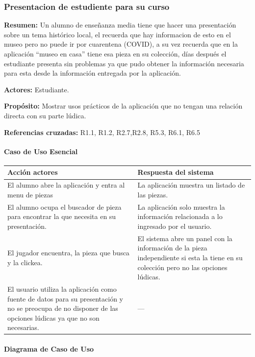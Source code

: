 \subsubsection{Presentacion de estudiente para su curso}

{\textbf {Resumen:}}
Un alumno de enseñanza media tiene que hacer una presentación sobre un tema histórico local, el recuerda que hay informacion de esto en el museo pero no puede ir por cuarentena (COVID), a su vez recuerda que en la aplicación “museo en casa” tiene esa pieza en su colección, días después el estudiante presenta sin problemas ya que pudo obtener la información necesaria para esta desde la información entregada por la aplicación.

{\textbf {Actores:}}
Estudiante.

{\textbf {Propósito:}}
Mostrar usos prácticos de la aplicación que no tengan una relación directa con su parte lúdica.

{\textbf {Referencias cruzadas:}}
R1.1, R1.2, R2.7,R2.8, R5.3, R6.1, R6.5

\paragraph{Caso de Uso Esencial}

\begin{longtable}{|p{5cm}|p{8cm}|}
\hline 
Acción actores & Respuesta del sistema \\ 
\hline 
El alumno abre la aplicación y entra al menu de piezas & La aplicación muestra un listado de las piezas. \\ 
\hline
El alumno ocupa el buscador de pieza para encontrar la que necesita en su presentación. & La aplicación solo muestra la información relacionada a lo ingresado por el usuario. \\ 
\hline 
El jugador encuentra, la pieza que busca y la clickea. & El sistema abre un panel con la información de la pieza independiente si esta la tiene en su colección pero no las opciones lúdicas. \\ 
\hline 
El usuario utiliza la aplicación como fuente de datos para su presentación y no se preocupa de no disponer de las opciones lúdicas ya que no son necesarias. & --- \\ 
\hline 
\end{longtable}

\paragraph{Diagrama de Caso de Uso}

